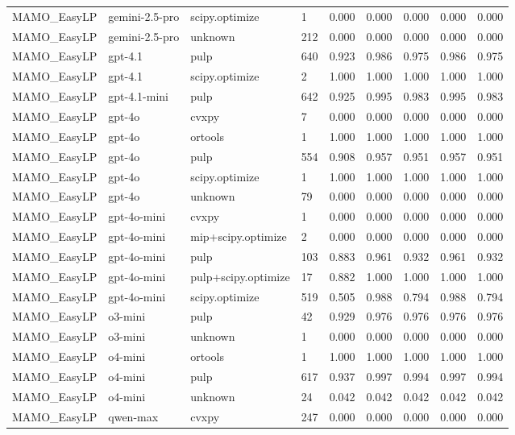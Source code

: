 \begin{table}[t]
\begin{tabular}{lllllllll}
MAMO\_EasyLP & gemini-2.5-pro & scipy.optimize & 1 & 0.000 & 0.000 & 0.000 & 0.000 & 0.000 \\
MAMO\_EasyLP & gemini-2.5-pro & unknown & 212 & 0.000 & 0.000 & 0.000 & 0.000 & 0.000 \\
MAMO\_EasyLP & gpt-4.1 & pulp & 640 & 0.923 & 0.986 & 0.975 & 0.986 & 0.975 \\
MAMO\_EasyLP & gpt-4.1 & scipy.optimize & 2 & 1.000 & 1.000 & 1.000 & 1.000 & 1.000 \\
MAMO\_EasyLP & gpt-4.1-mini & pulp & 642 & 0.925 & 0.995 & 0.983 & 0.995 & 0.983 \\
MAMO\_EasyLP & gpt-4o & cvxpy & 7 & 0.000 & 0.000 & 0.000 & 0.000 & 0.000 \\
MAMO\_EasyLP & gpt-4o & ortools & 1 & 1.000 & 1.000 & 1.000 & 1.000 & 1.000 \\
MAMO\_EasyLP & gpt-4o & pulp & 554 & 0.908 & 0.957 & 0.951 & 0.957 & 0.951 \\
MAMO\_EasyLP & gpt-4o & scipy.optimize & 1 & 1.000 & 1.000 & 1.000 & 1.000 & 1.000 \\
MAMO\_EasyLP & gpt-4o & unknown & 79 & 0.000 & 0.000 & 0.000 & 0.000 & 0.000 \\
MAMO\_EasyLP & gpt-4o-mini & cvxpy & 1 & 0.000 & 0.000 & 0.000 & 0.000 & 0.000 \\
MAMO\_EasyLP & gpt-4o-mini & mip+scipy.optimize & 2 & 0.000 & 0.000 & 0.000 & 0.000 & 0.000 \\
MAMO\_EasyLP & gpt-4o-mini & pulp & 103 & 0.883 & 0.961 & 0.932 & 0.961 & 0.932 \\
MAMO\_EasyLP & gpt-4o-mini & pulp+scipy.optimize & 17 & 0.882 & 1.000 & 1.000 & 1.000 & 1.000 \\
MAMO\_EasyLP & gpt-4o-mini & scipy.optimize & 519 & 0.505 & 0.988 & 0.794 & 0.988 & 0.794 \\
MAMO\_EasyLP & o3-mini & pulp & 42 & 0.929 & 0.976 & 0.976 & 0.976 & 0.976 \\
MAMO\_EasyLP & o3-mini & unknown & 1 & 0.000 & 0.000 & 0.000 & 0.000 & 0.000 \\
MAMO\_EasyLP & o4-mini & ortools & 1 & 1.000 & 1.000 & 1.000 & 1.000 & 1.000 \\
MAMO\_EasyLP & o4-mini & pulp & 617 & 0.937 & 0.997 & 0.994 & 0.997 & 0.994 \\
MAMO\_EasyLP & o4-mini & unknown & 24 & 0.042 & 0.042 & 0.042 & 0.042 & 0.042 \\
MAMO\_EasyLP & qwen-max & cvxpy & 247 & 0.000 & 0.000 & 0.000 & 0.000 & 0.000 \\

\end{tabular}
\end{table}
